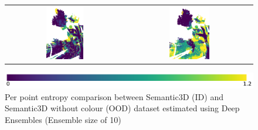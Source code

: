 \begin{figure}[h!]
\begin{tabular}{cc}
            \includegraphics[width=0.33\textwidth, height=0.22\textheight]{images/ood_imgs/de_sem3d/de_ent_10_3.pdf}&
            \includegraphics[width=0.33\textwidth, height=0.22\textheight]{images/sem3d_of/de_ent_sem3d_of_3.pdf}\\
        \end{tabular}
        \includegraphics[scale=0.45]{images/ent_legend.pdf}
        \caption{Per point entropy comparison between Semantic3D (ID) and Semantic3D without colour (OOD) dataset estimated using Deep Ensembles (Ensemble size of 10)}
        \label{fig:de_entmap_vis_sem3d_OF}
    \end{figure}
